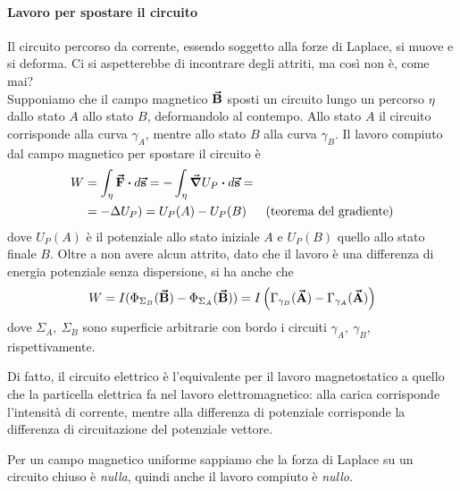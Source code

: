 \paragraph{Lavoro per spostare il circuito}
Il circuito percorso da corrente, essendo soggetto alla forze di Laplace, si muove e si deforma. Ci si aspetterebbe di incontrare degli attriti, ma così non è, come mai?\\
Supponiamo che il campo magnetico $\vb*{\va{B}}$ sposti un circuito lungo un percorso $\eta$ dallo stato $A$ allo stato $B$, deformandolo al contempo. Allo stato $A$ il circuito corrisponde alla curva $\gamma_A$, mentre allo stato $B$ alla curva $\gamma_B$. Il lavoro compiuto dal campo magnetico per spostare il circuito è
\begin{align*}
	W&=\int_{\eta}\vba{F}\vdot d\vba{s}=-\int_{\eta}\grad{U_P}\vdot d\vba{s}=&&\\
	&=-\Delta{U_P})=U_P(A)-U_P(B)&&\text{(teorema del gradiente)}
\end{align*}
dove $U_P(A)$ è il potenziale allo stato iniziale $A$ e $U_P(B)$ quello allo stato finale $B$. Oltre a non avere alcun attrito, dato che il lavoro è una differenza di energia potenziale senza dispersione, si ha anche che
\begin{equation}
	W=I(\Phi_{\Sigma_B}(\vb*{\va{B}})-\Phi_{\Sigma_A}(\vb*{\va{B}}))=I\left(\Gamma_{\gamma_B}(\vb*{\va{A}})-\Gamma_{\gamma_A}(\vb*{\va{A}})\right)
\end{equation}
dove $\Sigma_A,\ \Sigma_B$ sono superficie arbitrarie con bordo i circuiti $\gamma_A,\ \gamma_B$, rispettivamente.

Di fatto, il circuito elettrico è l'equivalente per il lavoro magnetostatico a quello che la particella elettrica fa nel lavoro elettromagnetico: alla carica corrisponde l'intensità di corrente, mentre alla differenza di potenziale corrisponde la differenza di circuitazione del potenziale vettore.

Per un campo magnetico uniforme sappiamo che la forza di Laplace su un circuito chiuso è \textit{nulla}, quindi anche il lavoro compiuto è \textit{nullo}.
